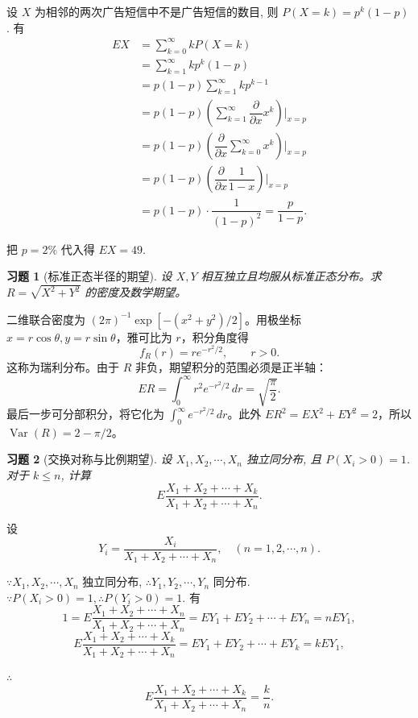\documentclass[UTF8,12pt,a4paper,fontset=fandol]{ctexart}
\newtheorem{exercise}{习题}[section]
\begin{document}
\begin{solve}\label{a:A5.5}
    设 $X$ 为相邻的两次广告短信中不是广告短信的数目, 则 $P(X=k)=p^k(1-p)$. 有
    \begin{align*}
        EX & =\sum\limits_{k=0}^\infty kP(X=k) \\
        & =\sum\limits_{k=1}^\infty kp^k(1-p) \\
        & =p(1-p)\sum\limits_{k=1}^\infty kp^{k-1} \\
        & =p(1-p)\left(\sum\limits_{k=1}^\infty\dfrac{\partial}{\partial x}x^k\right)\Bigg|_{x=p} \\
        & =p(1-p)\left(\dfrac{\partial}{\partial x}\sum\limits_{k=0}^\infty x^k\right)\Bigg|_{x=p} \\
        & =p(1-p)\left(\dfrac{\partial}{\partial x}\dfrac{1}{1-x}\right)\Bigg|_{x=p} \\
        & =p(1-p)\cdot\dfrac{1}{(1-p)^2}=\dfrac{p}{1-p}.
    \end{align*}

    把 $p=2\%$ 代入得 $EX=49$.
\end{solve}

\begin{exercise}[标准正态半径的期望]\label{q:A5.8}
设 $X,Y$ 相互独立且均服从标准正态分布。求 $R=\sqrt{X^2+Y^2}$ 的密度及数学期望。\par{}
\end{exercise}

\begin{solve}\label{a:A5.8}二维联合密度为 $(2\pi)^{-1}\exp[-(x^2+y^2)/2]$。用极坐标 $x=r\cos\theta,y=r\sin\theta$，雅可比为 $r$，积分角度得\[f_R(r)=r e^{-r^2/2},\qquad r>0.\]这称为瑞利分布。由于 $R$ 非负，期望积分的范围必须是正半轴：\[ER=\int_0^\infty r^2e^{-r^2/2}\,dr=\sqrt{\frac\pi2}.\]最后一步可分部积分，将它化为 $\int_0^\infty e^{-r^2/2}\,dr$。此外 $ER^2=EX^2+EY^2=2$，所以 $\operatorname{Var}(R)=2-\pi/2$。\end{solve}

\begin{exercise}[交换对称与比例期望]\label{q:A5.9}
设 $X_1,X_2,\cdots,X_n$ 独立同分布, 且 $P(X_i>0)=1$. 对于 $k\leq n$, 计算
    \[E\dfrac{X_1+X_2+\cdots+X_k}{X_1+X_2+\cdots+X_n}.\]\par{}
\end{exercise}

\begin{solve}\label{a:A5.9}
    设
    \[Y_i=\dfrac{X_i}{X_1+X_2+\cdots+X_n},\quad (n=1,2,\cdots,n).\]
    
    $\because X_1,X_2,\cdots,X_n$ 独立同分布, $\therefore Y_1,Y_2,\cdots,Y_n$ 同分布. $\because P(X_i>0)=1,\therefore P(Y_i>0)=1$. 有
    \[1=E\dfrac{X_1+X_2+\cdots+X_n}{X_1+X_2+\cdots+X_n}=EY_1+EY_2+\cdots+EY_n=nEY_1,\]
    \[E\dfrac{X_1+X_2+\cdots+X_k}{X_1+X_2+\cdots+X_n}=EY_1+EY_2+\cdots+EY_k=kEY_1,\]

    $\therefore$
    \[E\dfrac{X_1+X_2+\cdots+X_k}{X_1+X_2+\cdots+X_n}=\dfrac{k}{n}.\]
\end{solve}
\end{document}
